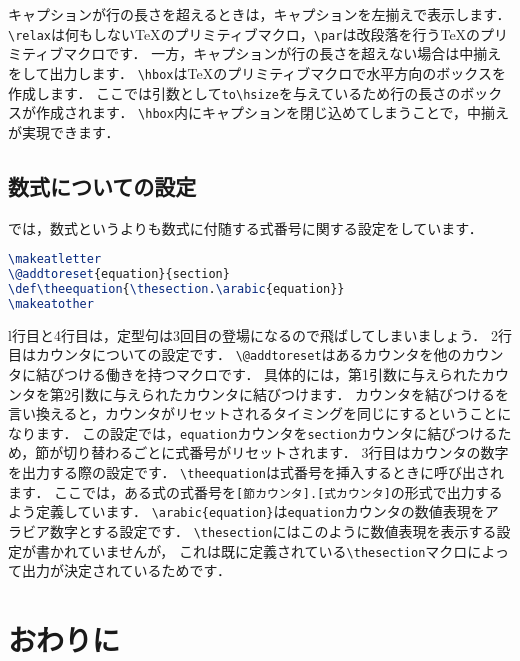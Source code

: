 キャプションが行の長さを超えるときは，キャプションを左揃えで表示します．
\verb|\relax|は何もしない{\TeX}のプリミティブマクロ，\verb|\par|は改段落を行う{\TeX}のプリミティブマクロです．
一方，キャプションが行の長さを超えない場合は中揃えをして出力します．
\verb|\hbox|は{\TeX}のプリミティブマクロで水平方向のボックスを作成します．
ここでは引数として\verb|to\hsize|を与えているため行の長さのボックスが作成されます．
\verb|\hbox|内にキャプションを閉じ込めてしまうことで，中揃えが実現できます．


\subsection{数式についての設定}

では，数式というよりも数式に付随する式番号に関する設定をしています．
\begin{lstlisting}[caption = 数式についての設定, label = list:eq, language = tex]
\makeatletter
\@addtoreset{equation}{section}
\def\theequation{\thesection.\arabic{equation}}
\makeatother
\end{lstlisting}

l行目と4行目は，定型句は3回目の登場になるので飛ばしてしまいましょう．
2行目はカウンタについての設定です．
\verb|\@addtoreset|はあるカウンタを他のカウンタに結びつける働きを持つマクロです．
具体的には，第1引数に与えられたカウンタを第2引数に与えられたカウンタに結びつけます．
カウンタを結びつけるを言い換えると，カウンタがリセットされるタイミングを同じにするということになります．
この設定では，\verb|equation|カウンタを\verb|section|カウンタに結びつけるため，節が切り替わるごとに式番号がリセットされます．
3行目はカウンタの数字を出力する際の設定です．
\verb|\theequation|は式番号を挿入するときに呼び出されます．
ここでは，ある式の式番号を\verb|[節カウンタ].[式カウンタ]|の形式で出力するよう定義しています．
\verb|\arabic{equation}|は\verb|equation|カウンタの数値表現をアラビア数字とする設定です．
\verb|\thesection|にはこのように数値表現を表示する設定が書かれていませんが，
これは既に定義されている\verb|\thesection|マクロによって出力が決定されているためです．


\section{おわりに}

